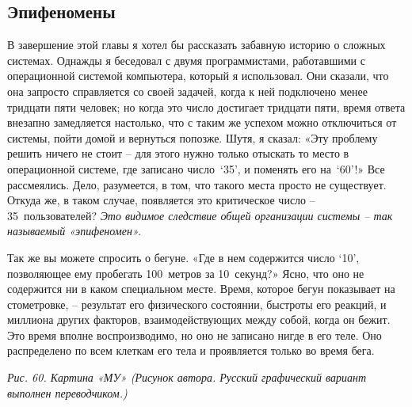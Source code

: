 \documentclass[../main.tex]{subfiles}
\begin{document}
\subsection{Эпифеномены}

В завершение этой главы я хотел бы рассказать забавную историю о сложных системах. Однажды я беседовал с двумя программистами, работавшими с операционной системой компьютера, который я использовал. Они сказали, что она запросто справляется со своей задачей, когда к ней подключено менее тридцати пяти человек; но когда это число достигает тридцати пяти, время ответа внезапно замедляется настолько, что с таким же успехом можно отключиться от системы, пойти домой и вернуться попозже. Шутя, я сказал: «Эту проблему решить ничего не стоит \--- для этого нужно только отыскать то место в операционной системе, где записано число~\enquote*{35}, и поменять его на~\enquote*{60}!» Все рассмеялись. Дело, разумеется, в том, что такого места просто не существует. Откуда же, в таком случае, появляется это критическое число \--- 35~пользователей? \emph{Это видимое следствие общей организации системы \--- так называемый «эпифеномен».}

Так же вы можете спросить о бегуне. «Где в нем содержится число \enquote*{10}, позволяющее ему пробегать 100~метров за 10~секунд?» Ясно, что оно не содержится ни в каком специальном месте. Время, которое бегун показывает на стометровке, \--- результат его физического состоянии, быстроты его реакций, и миллиона других факторов, взаимодействующих между собой, когда он бежит. Это время вполне воспроизводимо, но оно не записано нигде в его теле. Оно распределено по всем клеткам его тела и проявляется только во время бега.

\emph{Рис. 60. Картина «МУ» (Рисунок автора. Русский графический вариант выполнен переводчиком.)}
\end{document}
